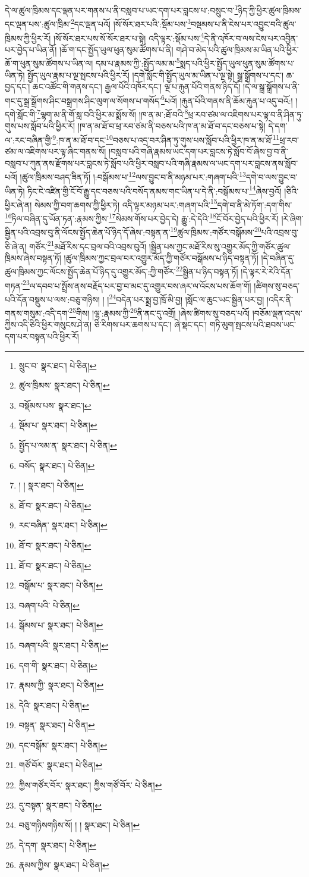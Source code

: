 དེ་ལ་ཚུལ་ཁྲིམས་དང་ལྡན་པར་གནས་པ་ནི་བསླབ་པ་ཡང་དག་པར་བླངས་པ་:བསྲུང་བ་\footnote{སྲུང་བ་  སྣར་ཐང་།  པེ་ཅིན། }ཉིད་ཀྱི་ཕྱིར་ཚུལ་ཁྲིམས་དང་ལྡན་པས་:ཚུལ་ཁྲིམ་\footnote{ཚུལ་ཁྲིམས་  སྣར་ཐང་།  པེ་ཅིན། }དང་ལྡན་པའོ། །སོ་སོར་ཐར་པའི་:སྡོམ་པས་\footnote{བསྡོམས་པས་  སྣར་ཐང་། }བསྡམས་པ་ནི་ངེས་པར་འབྱུང་བའི་ཚུལ་ཁྲིམས་ཀྱི་ཕྱིར་རོ། །སོ་སོར་ཐར་པས་སོ་སོར་ཐར་པ་སྟེ། འདི་ལྟར་:སྡོམ་པས་\footnote{སྡོམ་པ་  སྣར་ཐང་།  པེ་ཅིན། }དེ་ནི་འཁོར་བ་ལས་ངེས་པར་འབྱིན་པར་བྱེད་པ་ཡིན་ནོ། །ཆོ་ག་དང་སྤྱོད་ཡུལ་ཕུན་སུམ་ཚོགས་པ་ནི། གཤེ་བ་མེད་པའི་ཚུལ་ཁྲིམས་མ་ཡིན་པའི་ཕྱིར་ཆོ་ག་ཕུན་སུམ་ཚོགས་པ་ཡིན་ལ། དམ་པ་རྣམས་ཀྱི་:སྤྱོད་ལམ་མ་\footnote{སྤྱོད་པ་ལམ་ན་  སྣར་ཐང་།  པེ་ཅིན། }སྨད་པའི་ཕྱིར་སྤྱོད་ཡུལ་ཕུན་སུམ་ཚོགས་པ་ཡིན་ཏེ། སྤྱོད་ཡུལ་རྣམ་པ་ལྔ་སྤངས་པའི་ཕྱིར་རོ། །དགེ་སློང་གི་སྤྱོད་ཡུལ་མ་ཡིན་པ་ལྔ་སྟེ། སྒྲ་སྒྲོགས་པ་དང་། ཆ་བྱད་དང་། ཆང་འཚོང་གི་གནས་དང་། རྒྱལ་པོའི་འཁོར་དང་། ལྔ་པ་རྐུན་པོའི་གནས་ཉིད་དོ། །དེ་ལ་སྒྲ་སྒྲོགས་པ་ནི་གང་དུ་སྒྲ་སྒྲོགས་ཤིང་བསྒྲགས་ཤིང་ལུག་ལ་སོགས་པ་གསོད་\footnote{བསོད་  སྣར་ཐང་།  པེ་ཅིན། }པའོ། །རྐུན་པོའི་གནས་ནི་ཆོམ་རྐུན་པ་འདུ་བའོ:། །དགེ་སློང་གི་\footnote{། །  སྣར་ཐང་།  པེ་ཅིན། }ལྷག་མ་ནི་གོ་སླ་བའི་ཕྱིར་མ་སྨོས་སོ། །ཁ་ན་མ་:ཐོ་བའི་\footnote{ཐོ་བ་  སྣར་ཐང་།  པེ་ཅིན། }ཕྲ་རབ་ཙམ་ལ་འཇིགས་པར་ལྟ་བ་ནི་ཤིན་ཏུ་གུས་པས་སློབ་པའི་ཕྱིར་རོ། །ཁ་ན་མ་ཐོ་བ་ཕྲ་རབ་ཙམ་ནི་བཅས་པའི་ཁ་ན་མ་ཐོ་བ་དང་བཅས་པ་སྟེ། དེ་དག་ལ་:རང་བཞིན་གྱི་\footnote{རང་བཞིན་  སྣར་ཐང་།  པེ་ཅིན། }:ཁ་ན་མ་ཐོ་བ་དང་\footnote{ཐོ་བ་  སྣར་ཐང་།  པེ་ཅིན། }བཅས་པ་འདྲ་བར་ཤིན་ཏུ་གུས་པས་སློབ་པའི་ཕྱིར་ཁ་ན་མ་ཐོ་\footnote{ཐོ་བ་  སྣར་ཐང་།  པེ་ཅིན། }ཕྲ་རབ་ཙམ་ལ་འཇིགས་པར་ལྟ་ཞིང་གནས་སོ། །བསླབ་པའི་གཞི་རྣམས་ཡང་དག་པར་བླངས་ཏེ་སློབ་བོ་ཞེས་བྱ་བ་ནི་བསླབ་པ་ཀུན་ནས་རྫོགས་པར་བླངས་ཏེ་སློབ་པའི་ཕྱིར་བསླབ་པའི་གཞི་རྣམས་ལ་ཡང་དག་པར་བླངས་ནས་སློབ་པའོ། །ཚུལ་ཁྲིམས་བཤད་ཟིན་ཏོ། །:བསྒོམས་པ་\footnote{བསྒོམ་པ་  སྣར་ཐང་།  པེ་ཅིན། }ལས་བྱུང་བ་ནི་མཉམ་པར་:གཞག་པའི་\footnote{བཞག་པའི་  པེ་ཅིན། }དགེ་བ་ལས་བྱུང་བ་ཡིན་ཏེ། ཏིང་ངེ་འཛིན་གྱི་ངོ་བོ་རྒྱུ་དང་བཅས་པའི་བསོད་ནམས་གང་ཡིན་པ་དེ་ནི་:བསྒོམས་པ་\footnote{སྒོམས་པ་  སྣར་ཐང་།  པེ་ཅིན། }ཞེས་བྱའོ། །ཅིའི་ཕྱིར་ཞེ་ན། སེམས་ཀྱི་བག་ཆགས་ཀྱི་ཕྱིར་ཏེ། འདི་ལྟར་མཉམ་པར་:གཞག་པའི་\footnote{བཞག་པའི་  སྣར་ཐང་།  པེ་ཅིན། }དགེ་བ་ནི་མེ་ཏོག་:དག་གིས་\footnote{དག་གི་  སྣར་ཐང་།  པེ་ཅིན། }ཏིལ་བཞིན་དུ་ཡོན་ཏན་:རྣམས་ཀྱིས་\footnote{རྣམས་ཀྱི་  སྣར་ཐང་།  པེ་ཅིན། }སེམས་གོས་པར་བྱེད་དེ། རྒྱུ་:དེ་དེའི་\footnote{དེའི་  སྣར་ཐང་།  པེ་ཅིན། }ངོ་བོར་བྱེད་པའི་ཕྱིར་རོ། །རེ་ཞིག་སྦྱིན་པའི་འབྲས་བུ་ནི་ལོངས་སྤྱོད་ཆེན་པོ་ཉིད་དོ་ཞེས་:བསྟན་ན་\footnote{བསྟན་  སྣར་ཐང་།  པེ་ཅིན། }ཚུལ་ཁྲིམས་:གཙོར་བསྒོམས་\footnote{དང་བསྒོམ་  སྣར་ཐང་།  པེ་ཅིན། }པའི་འབྲས་བུ་ཅི་ཞེ་ན། གཙོར་\footnote{གཙོ་བོར་  སྣར་ཐང་།  པེ་ཅིན། }མཐོ་རིས་དང་བྲལ་བའི་འབྲས་བུའོ། །སྦྱིན་པས་ཀྱང་མཐོ་རིས་སུ་འགྱུར་མོད་ཀྱི་གཙོར་ཚུལ་ཁྲིམས་ཞེས་བསྟན་ཏོ། །ཚུལ་ཁྲིམས་ཀྱང་བྲལ་བར་འགྱུར་མོད་ཀྱི་གཙོར་བསྒོམས་པ་ཉིད་བསྟན་ཏོ། །དེ་བཞིན་དུ་ཚུལ་ཁྲིམས་ཀྱང་ལོངས་སྤྱོད་ཆེན་པོ་ཉིད་དུ་འགྱུར་མོད་:ཀྱི་གཙོར་\footnote{ཀྱིས་གཙོར་བོར་  སྣར་ཐང་། ཀྱིས་གཙོ་བོར་  པེ་ཅིན། }སྦྱིན་པ་ཉིད་བསྟན་ཏོ། །དེ་ལྟར་རེ་རེའི་དོན་གཏན་\footnote{དུ་བསྟན་  སྣར་ཐང་།  པེ་ཅིན། }ལ་དབབ་པ་སྤྲོས་ནས་བརྗོད་པར་བྱ་བ་མང་དུ་འགྱུར་བས་ཞར་ལ་འོངས་པས་ཆོག་གོ། །ཚིགས་སུ་བཅད་པའི་དོན་བསྡུས་པ་ལས་:བཅུ་གཉིས། ། །\footnote{བཅུ་གཉིསགཉིས་སོ། ། །  སྣར་ཐང་།  པེ་ཅིན། }བདེན་པར་སྨྲ་བྱ་ཁྲོ་མི་བྱ། །སློང་ལ་ཆུང་ཡང་སྦྱིན་པར་བྱ། །འདིར་ནི་གནས་གསུམ་:འདི་དག་\footnote{དེ་དག་  སྣར་ཐང་།  པེ་ཅིན། }གིས། །ལྷ་:རྣམས་ཀྱི་\footnote{རྣམས་ཀྱིས་  སྣར་ཐང་།  པེ་ཅིན། }ནི་ནང་དུ་འགྲོ། །ཞེས་ཚིགས་སུ་བཅད་པའོ། །བཅོམ་ལྡན་འདས་ཀྱིས་འདི་ཅིའི་ཕྱིར་གསུངས་ཤེ་ན། ཅི་རིགས་པར་ཆགས་པ་དང་། ཞེ་སྡང་དང་། གཏི་མུག་སྤངས་པའི་ཐབས་ཡང་དག་པར་བསྟན་པའི་ཕྱིར་རོ། 